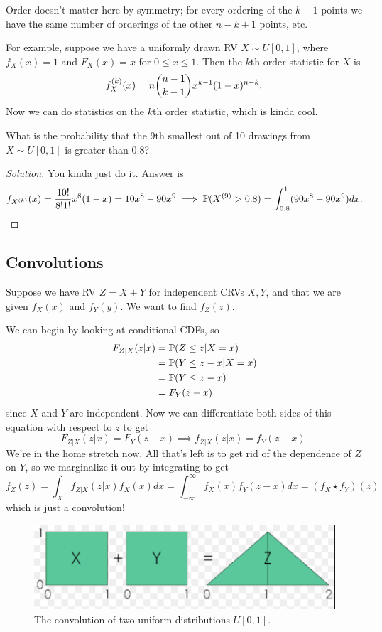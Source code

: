 \documentclass[11 pt]{scrartcl}
\begin{document}
Order doesn't matter here by symmetry; for every ordering of the $k-1$ points we have the same number of orderings of the other $n-k+1$ points, etc. 

For example, suppose we have a uniformly drawn RV $X\sim U[0,1]$, where  $f_X(x) = 1$ and $F_X(x) = x$ for $0\leq x\leq 1$. Then the $k$th order statistic for $X$ is 
\[f_X^{(k)}(x) = n\dbinom{n-1}{k-1} x^{k-1}(1-x)^{n-k}.\] 
Now we can do statistics on the $k$th order statistic, which is kinda cool. 

\begin{question}
    What is the probability that the 9th smallest out of 10 drawings from $X\sim U[0,1]$ is greater than $0.8$? 
\end{question}
\begin{proof}[Solution]
    You kinda just do it. Answer is 
    \[ f_{X^{(k)}}(x) = \dfrac{10!}{8!1!} x^8(1-x) = 10x^8 -90x^9 \implies \mathbb P(X^{(9)} > 0.8) = \int_{0.8}^1 (90x^8 - 90x^9)dx.\] 
\end{proof}

\subsection{Convolutions}
Suppose we have RV $Z = X+Y$ for independent CRVs $X,Y$, and that we are given $f_X(x)$ and $f_Y(y)$. We want to find $f_Z(z)$. 

We can begin by looking at conditional CDFs, so 
    \begin{align*}
        F_{Z|X}(z|x) &= \mathbb P(Z \leq z | X = x) \\ 
                     &= \mathbb P(Y \leq z-x | X = x) \\ 
                     &= \mathbb P(Y \leq z-x)  \\ 
                     &= F_Y(z-x)
    \end{align*}
since $X$ and $Y$ are independent. Now we can differentiate both sides of this equation with respect to $z$ to get 
\[ F_{Z|X}(z|x) = F_Y(z-x) \implies f_{Z|X}(z|x)  = f_Y(z-x).\] 
We're in the home stretch now. All that's left is to get rid of the dependence of $Z$ on $Y$, so we marginalize it out by integrating to get 
\[ f_Z(z) = \int_X f_{Z|X}(z|x) f_X(x) dx = \int_{-\infty}^\infty f_X(x)f_Y(z-x)dx =  (f_X\star f_Y)(z)\] 
which is just a convolution! 

\begin{figure}[!ht]
    \centering
\includegraphics[scale = 0.8]{conv_u2.png}
\caption{The convolution of two uniform distributions $U[0,1]$.}
\end{figure}
\end{document}
